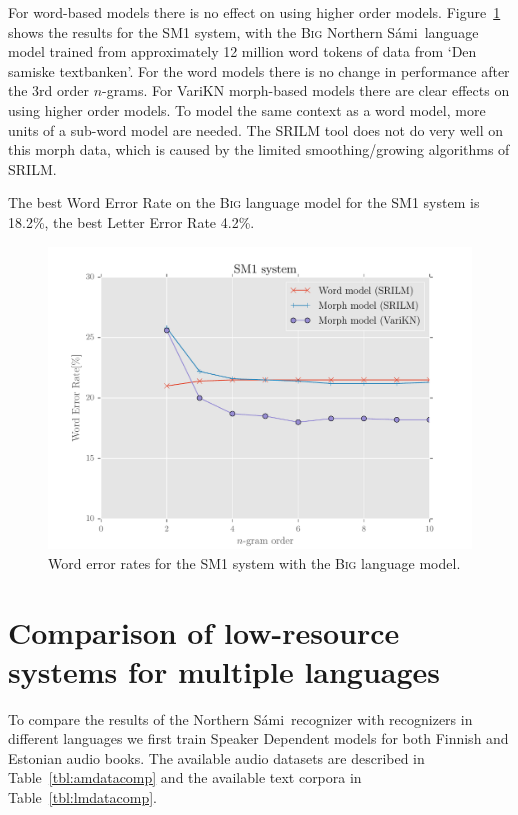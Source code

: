 \documentclass[b5paper]{article}
\newcommand{\ns}{Northern Sámi}
\newcommand{\ngram}{$n$-gram}
\newcommand{\ds}[1]{\textsc{#1}}
\begin{document}
For word-based models there is no effect on using higher order models. Figure~\ref{fig:samiperf} shows the results for the SM1 system, with the \ds{Big} \ns\ language model trained from approximately 12 million word tokens of data from `Den samiske textbanken'. For the word models there is no change in performance after the 3rd order \ngram s. For VariKN morph-based models there are clear effects on using higher order models. To model the same context as a word model, more units of a sub-word model are needed. The SRILM tool does not do very well on this morph data, which is caused by the limited smoothing/growing algorithms of SRILM.

The best Word Error Rate on the \ds{Big} language model for the SM1 system is 18.2\%, the best Letter Error Rate 4.2\%. 

\begin{figure}
\centering
\includegraphics[width=.9\textwidth]{figures/sme1}
\caption{Word error rates for the SM1 system with the \ds{Big} language model.}\label{fig:samiperf}

\end{figure}





\section{Comparison of low-resource systems for multiple languages}
\label{sec:compexp}
To compare the results of the \ns\ recognizer with recognizers in different languages we first train Speaker Dependent models for both Finnish and Estonian audio books. The available audio datasets are described in Table~\ref{tbl:amdatacomp} and the available text corpora in Table~\ref{tbl:lmdatacomp}. 
\end{document}
